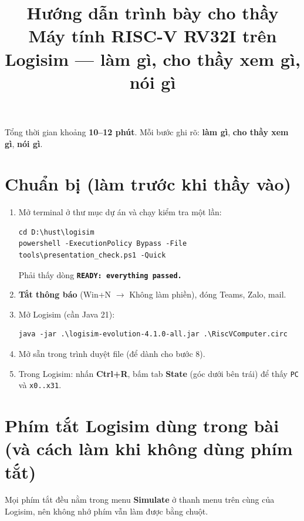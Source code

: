 \documentclass[11pt,a4paper]{article}
\title{\textbf{Hướng dẫn trình bày cho thầy}\\[3pt]\large Máy tính RISC-V RV32I trên Logisim --- làm gì, cho thầy xem gì, nói gì}
\author{}
\date{}
\newcommand{\p}[1]{\texttt{\detokenize{#1}}}
\begin{document}
\maketitle

Tổng thời gian khoảng \textbf{10--12 phút}. Mỗi bước ghi rõ: \textbf{làm gì}, \textbf{cho thầy xem gì}, \textbf{nói gì}.

\section{Chuẩn bị (làm trước khi thầy vào)}
\begin{enumerate}
  \item Mở terminal ở thư mục dự án và chạy kiểm tra một lần:
\begin{verbatim}
cd D:\hust\logisim
powershell -ExecutionPolicy Bypass -File tools\presentation_check.ps1 -Quick
\end{verbatim}
  Phải thấy dòng \textbf{\texttt{READY: everything passed.}}
  \item \textbf{Tắt thông báo} (Win+N $\rightarrow$ Không làm phiền), đóng Teams, Zalo, mail.
  \item Mở Logisim (cần Java 21):
\begin{verbatim}
java -jar .\logisim-evolution-4.1.0-all.jar .\RiscVComputer.circ
\end{verbatim}
  \item Mở sẵn trong trình duyệt file \p{D:\hust\logisim\docs\web\index.html} (để dành cho bước 8).
  \item Trong Logisim: nhấn \textbf{Ctrl+R}, bấm tab \textbf{State} (góc dưới bên trái) để thấy \texttt{PC} và \texttt{x0..x31}.
\end{enumerate}

\section{Phím tắt Logisim dùng trong bài (và cách làm khi không dùng phím tắt)}
Mọi phím tắt đều nằm trong menu \textbf{Simulate} ở thanh menu trên cùng của Logisim, nên không nhớ phím vẫn làm được bằng chuột.
\end{document}
